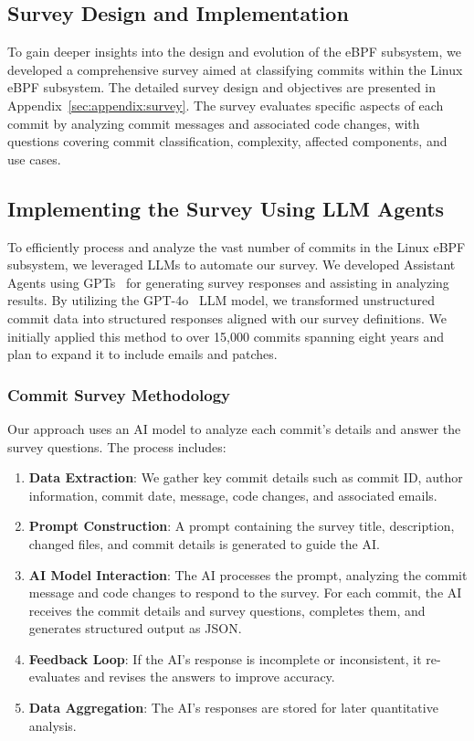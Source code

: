 \subsection{Survey Design and Implementation}

To gain deeper insights into the design and evolution of the eBPF subsystem, we developed a comprehensive survey aimed at classifying commits within the Linux eBPF subsystem. The detailed survey design and objectives are presented in Appendix~\ref{sec:appendix:survey}. The survey evaluates specific aspects of each commit by analyzing commit messages and associated code changes, with questions covering commit classification, complexity, affected components, and use cases.

\subsection{Implementing the Survey Using LLM Agents}

To efficiently process and analyze the vast number of commits in the Linux eBPF subsystem, we leveraged LLMs to automate our survey. We developed Assistant Agents using GPTs~\cite{gpts} for generating survey responses and assisting in analyzing results. By utilizing the GPT-4o~\cite{gpt4o} LLM model, we transformed unstructured commit data into structured responses aligned with our survey definitions. We initially applied this method to over 15,000 commits spanning eight years and plan to expand it to include emails and patches.

\subsubsection{Commit Survey Methodology}

Our approach uses an AI model to analyze each commit's details and answer the survey questions. The process includes:

\begin{enumerate} 
\item \textbf{Data Extraction}: We gather key commit details such as commit ID, author information, commit date, message, code changes, and associated emails.
\item \textbf{Prompt Construction}: A prompt containing the survey title, description, changed files, and commit details is generated to guide the AI.
\item \textbf{AI Model Interaction}: The AI processes the prompt, analyzing the commit message and code changes to respond to the survey. For each commit, the AI receives the commit details and survey questions, completes them, and generates structured output as JSON.
\item \textbf{Feedback Loop}: If the AI's response is incomplete or inconsistent, it re-evaluates and revises the answers to improve accuracy.
\item \textbf{Data Aggregation}: The AI's responses are stored for later quantitative analysis.
\end{enumerate}

